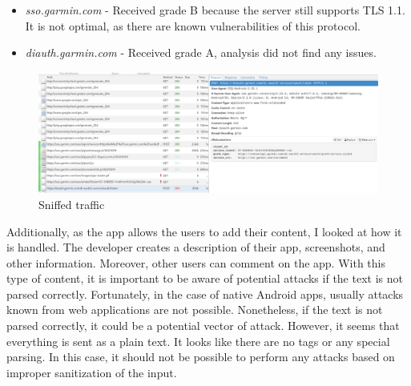\begin{itemize}
    \item \textit{sso.garmin.com} - Received grade B because the server still supports TLS 1.1.
    It is not optimal, as there are known vulnerabilities of this protocol.
    \item \textit{diauth.garmin.com} - Received grade A, analysis did not find any issues.
\end{itemize}

\begin{figure}[h]
    \centering
    \includegraphics[width=1\linewidth]{../../images/mitmproxy unpinner}
    \caption{Sniffed traffic}
    \label{fig:mitmproxy-unpinner}
\end{figure}

Additionally, as the app allows the users to add their content, I looked at how it is handled.
The developer creates a description of their app, screenshots, and other information.
Moreover, other users can comment on the app.
With this type of content, it is important to be aware of potential attacks if the text is not parsed correctly.
Fortunately, in the case of native Android apps, usually attacks known from web applications are not possible.
Nonetheless, if the text is not parsed correctly, it could be a potential vector of attack.
However, it seems that everything is sent as a plain text.
It looks like there are no tags or any special parsing.
In this case, it should not be possible to perform any attacks based on improper sanitization of the input.


